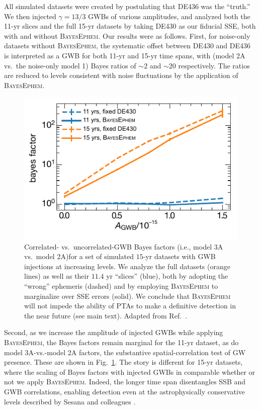 \documentclass[reprint,
 amsmath,amssymb,
 aps,prd,floatfix,
]{revtex4-1}
\begin{document}
All simulated datasets were created by postulating that DE436 was the ``truth.'' We then injected $\gamma = 13/3$ GWBs of various amplitudes, and analyzed both the 11-yr slices and the full 15-yr datasets by taking DE430 as our fiducial SSE, both with and without \textsc{BayesEphem}.
Our results were as follows.
First, for noise-only datasets without \textsc{BayesEphem}, the systematic offset between DE430 and DE436 is interpreted as a GWB for both 11-yr and 15-yr time spans, with (model 2A vs.\ the noise-only model 1) Bayes ratios of $\sim 2$ and $\sim 20$ respectively. The ratios are reduced to levels consistent with noise fluctuations by the application of \textsc{BayesEphem}.
%
\begin{figure}
    \includegraphics{figures/bayesephem_simulations.pdf}
    \caption{Correlated- vs.\ uncorrelated-GWB Bayes factors (i.e., model 3A vs.\ model 2A)for a set of simulated $15$-yr datasets with GWB injections at increasing levels.  We analyze the full datasets (orange lines) as well as their $11.4$ yr ``slices'' (blue), both by adopting the ``wrong'' ephemeris (dashed) and by employing \textsc{BayesEphem} to marginalize over SSE errors (solid). We conclude that \textsc{BayesEphem} will not impede the ability of PTAs to make a definitive detection in the near future (see main text). Adapted from Ref.\ \cite{2018ApJ...859...47A}. \label{fig:simulations}}
\end{figure}

Second, as we increase the amplitude of injected GWBs while applying \textsc{BayesEphem}, the Bayes factors remain marginal for the 11-yr dataset, as do model 3A-vs.-model 2A factors, the substantive spatial-correlation test of GW presence. These are shown in Fig.\ \ref{fig:simulations}.
The story is different for 15-yr datasets, where the scaling of Bayes factors with injected GWBs in comparable whether or not we apply \textsc{BayesEphem}. Indeed, the longer time span disentangles SSB and GWB correlations, enabling detection even at the astrophysically conservative levels described by Sesana and colleagues \cite{2016MNRAS.463L...6S}.
\end{document}
